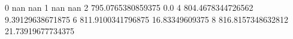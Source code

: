 0 nan nan
1 nan nan
2 795.0765380859375 0.0
4 804.4678344726562 9.39129638671875
6 811.9100341796875 16.83349609375
8 816.8157348632812 21.73919677734375

